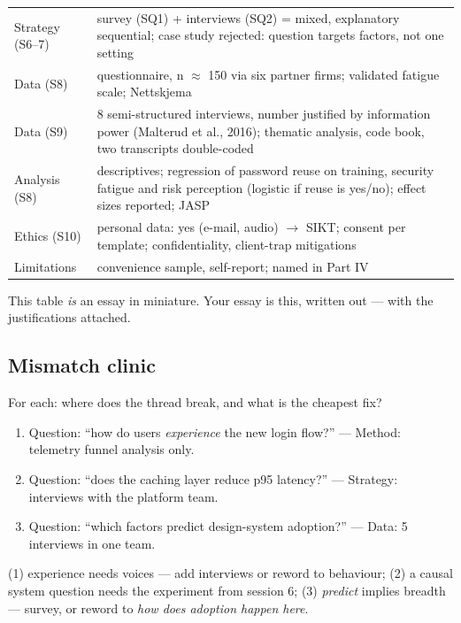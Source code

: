 \documentclass[11pt,a4paper,british,twoside=false,headings=small,chapterprefix=false,numbers=noenddot]{scrbook}
\begin{document}
\begin{center}\small
\footnotesize
  \renewcommand{\arraystretch}{1.3}
  \begin{tabular}{@{}p{3.2cm}p{10.2cm}@{}}
    \toprule
    Strategy (S6--7) & survey (SQ1) + interviews (SQ2) = mixed, explanatory sequential; case study rejected: question targets factors, not one setting\\
    Data (S8) & questionnaire, n $\approx$ 150 via six partner firms; validated fatigue scale; Nettskjema\\
    Data (S9) & 8 semi-structured interviews, number justified by information power (Malterud et al., 2016); thematic analysis, code book, two transcripts double-coded\\
    Analysis (S8) & descriptives; regression of password reuse on training, security fatigue and risk perception (logistic if reuse is yes/no); effect sizes reported; JASP\\
    Ethics (S10) & personal data: yes (e-mail, audio) $\rightarrow$ SIKT; consent per template; confidentiality, client-trap mitigations\\
    Limitations & convenience sample, self-report; named in Part IV\\
    \bottomrule
  \end{tabular}
  

  This table \emph{is} an essay in miniature. Your essay is this,
  written out --- with the justifications attached.
\end{center}


\subsection{Mismatch clinic}
\begin{center}\small
\small For each: where does the thread break, and what is the cheapest fix?
  
  \begin{enumerate}\setlength{\itemsep}{0.5em}
    \item Question: ``how do users \emph{experience} the new login flow?''
          --- Method: telemetry funnel analysis only.
    \item Question: ``does the caching layer reduce p95 latency?'' ---
          Strategy: interviews with the platform team.
    \item Question: ``which factors predict design-system adoption?'' ---
          Data: 5 interviews in one team.
  \end{enumerate}
  
  {\color{kgrey}\small (1) experience needs voices --- add interviews or
  reword to behaviour; (2) a causal system question needs the experiment
  from session 6; (3) \emph{predict} implies breadth --- survey, or reword to
  \emph{how does adoption happen here}.}
\end{center}
\end{document}
